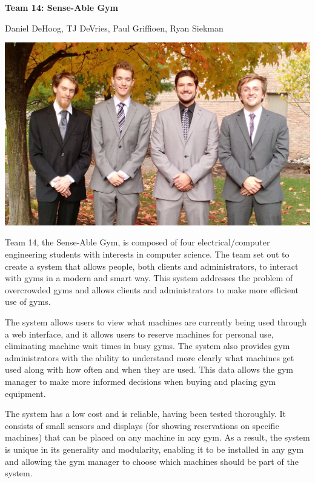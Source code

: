 \documentclass[letterpaper,11pt]{./templates/texMemo} %
\begin{document}
\centerline{\Huge{\textbf{Team 14: Sense-Able Gym}}}
\centerline{\LARGE{Daniel DeHoog, TJ DeVries, Paul Griffioen, Ryan Siekman}}

\centerline{\includegraphics[width=\textwidth]{Team.jpg}}

Team 14, the Sense-Able Gym, is composed of four electrical/computer engineering students with interests in computer science. The team set out to create a system that allows people, both clients and administrators, to interact with gyms in a modern and smart way. This system addresses the problem of overcrowded gyms and allows clients and administrators to make more efficient use of gyms.

The system allows users to view what machines are currently being used through a web interface, and it allows users to reserve machines for personal use, eliminating machine wait times in busy gyms. The system also provides gym administrators with the ability to understand more clearly what machines get used along with how often and when they are used. This data allows the gym manager to make more informed decisions when buying and placing gym equipment.

The system has a low cost and is reliable, having been tested thoroughly. It consists of small sensors and displays (for showing reservations on specific machines) that can be placed on any machine in any gym. As a result, the system is unique in its generality and modularity, enabling it to be installed in any gym and allowing the gym manager to choose which machines should be part of the system.
\end{document}
